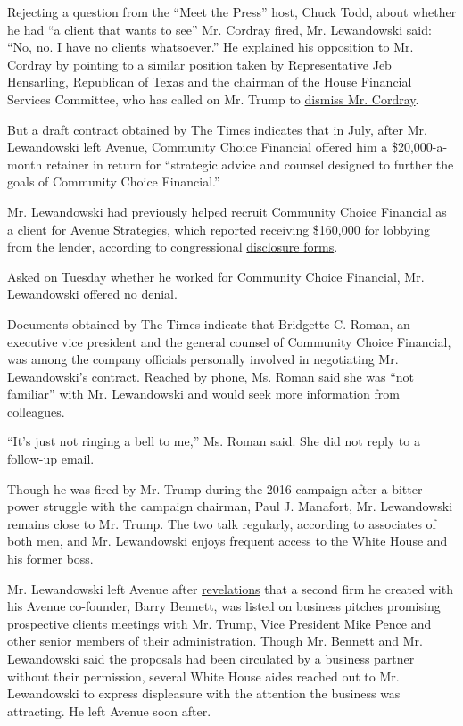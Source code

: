 Rejecting a question from the ``Meet the Press'' host, Chuck Todd, about
whether he had ``a client that wants to see'' Mr. Cordray fired, Mr.
Lewandowski said: ``No, no. I have no clients whatsoever.'' He explained
his opposition to Mr. Cordray by pointing to a similar position taken by
Representative Jeb Hensarling, Republican of Texas and the chairman of
the House Financial Services Committee, who has called on Mr. Trump to
\href{https://www.housingwire.com/articles/39774-hensarling-to-cfpbs-cordray-you-deserve-to-be-fired-immediately}{dismiss
Mr. Cordray}.

But a draft contract obtained by The Times indicates that in July, after
Mr. Lewandowski left Avenue, Community Choice Financial offered him a
\$20,000-a-month retainer in return for ``strategic advice and counsel
designed to further the goals of Community Choice Financial.''

Mr. Lewandowski had previously helped recruit Community Choice Financial
as a client for Avenue Strategies, which reported receiving \$160,000
for lobbying from the lender, according to congressional
\href{https://soprweb.senate.gov/index.cfm?event=getFilingDetails\&filingID=8BD796AE-C00E-432D-BF11-1CD04065AB8E\&filingTypeID=1}{disclosure
forms}.

Asked on Tuesday whether he worked for Community Choice Financial, Mr.
Lewandowski offered no denial.

Documents obtained by The Times indicate that Bridgette C. Roman, an
executive vice president and the general counsel of Community Choice
Financial, was among the company officials personally involved in
negotiating Mr. Lewandowski's contract. Reached by phone, Ms. Roman said
she was ``not familiar'' with Mr. Lewandowski and would seek more
information from colleagues.

``It's just not ringing a bell to me,'' Ms. Roman said. She did not
reply to a follow-up email.

Though he was fired by Mr. Trump during the 2016 campaign after a bitter
power struggle with the campaign chairman, Paul J. Manafort, Mr.
Lewandowski remains close to Mr. Trump. The two talk regularly,
according to associates of both men, and Mr. Lewandowski enjoys frequent
access to the White House and his former boss.

Mr. Lewandowski left Avenue after
\href{http://www.politico.com/story/2017/04/28/corey-lewandowski-trump-meetings-237725}{revelations}
that a second firm he created with his Avenue co-founder, Barry Bennett,
was listed on business pitches promising prospective clients meetings
with Mr. Trump, Vice President Mike Pence and other senior members of
their administration. Though Mr. Bennett and Mr. Lewandowski said the
proposals had been circulated by a business partner without their
permission, several White House aides reached out to Mr. Lewandowski to
express displeasure with the attention the business was attracting. He
left Avenue soon after.


